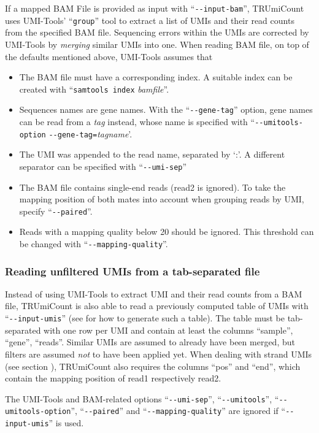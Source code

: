 \documentclass{scrartcl}
\makeatletter
\newcommand{\ddarg}[1]{\texttt{-{}-#1}}
\DeclareRobustCommand*{\nameref}[1]{%
      \textit{\my@nameref{#1}}%
    }%
\makeatother
\begin{document}
If a mapped BAM File is provided as input with ``\ddarg{input-bam}'', TRUmiCount uses UMI-Tools' ``\texttt{group}'' tool to extract a list of UMIs and their read counts from the specified BAM file. Sequencing errors within the UMIs are corrected by UMI-Tools by \emph{merging} similar UMIs into one. When reading BAM file, on top of the defaults mentioned above, UMI-Tools assumes that
\begin{itemize}
  \item The BAM file must have a corresponding index. A suitable index can be created with ``\texttt{samtools index} \textit{bamfile}''.
  \item Sequences names are gene names. With the ``\ddarg{gene-tag}'' option, gene names can be read from a \emph{tag} instead, whose name is specified with ``\ddarg{umitools-option} \allowbreak\ddarg{gene-tag=}\allowbreak\textit{tagname}'.
  \item The UMI was appended to the read name, separated by `:'. A different separator can be specified with ``\ddarg{umi-sep}''
  \item The BAM file contains single-end reads (read2 is ignored). To take the mapping position of both mates into account when grouping reads by UMI, specify ``\ddarg{paired}''.
  \item Reads with a mapping quality below 20 should be ignored. This threshold can be changed with ``\ddarg{mapping-quality}''.
\end{itemize}

\subsubsection*{Reading unfiltered UMIs from a tab-separated file}

Instead of using UMI-Tools to extract UMI and their read counts from a BAM file, TRUmiCount is also able to read a previously computed table of UMIs with ``\ddarg{input-umis}'' (see \nameref{output-options} for how to generate such a table). The table must be tab-separated with one row per UMI and contain at least the columns ``sample'', ``gene'', ``reads''. Similar UMIs are assumed to already have been merged, but filters are assumed \emph{not} to have been applied yet. When dealing with strand UMIs (see section \nameref{strand-umis}), TRUmiCount also requires the columns ``pos'' and ``end'', which contain the mapping position of read1 respectively read2.

\begin{sloppypar}
The UMI-Tools and BAM-related options ``\ddarg{umi-sep}'', ``\ddarg{umitools}'', ``\ddarg{umitools-option}'', ``\ddarg{paired}'' and ``\ddarg{mapping-quality}'' are ignored if ``\ddarg{input-umis}'' is used.
\end{sloppypar}
\end{document}
